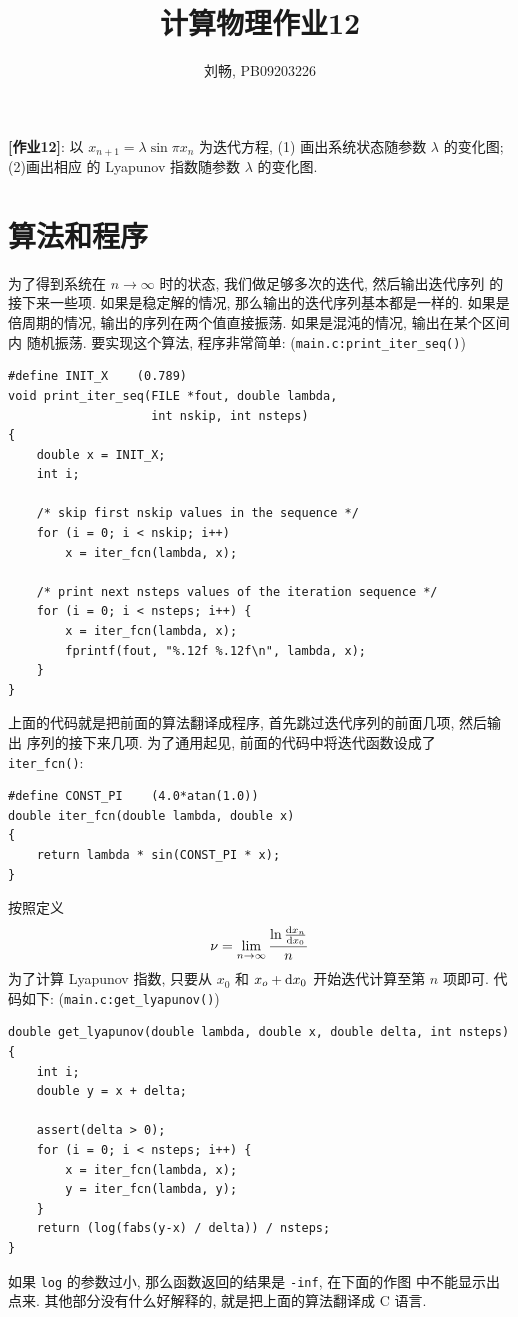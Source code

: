 \documentclass{ctexart}
\def\dd{{\rm d}}
\begin{document}
\title{计算物理作业12}
\author{刘畅, PB09203226}
\maketitle

{\bf [作业12]}: 以 $x_{n+1} = \lambda\sin\pi x_n$ 为迭代方程,
(1) 画出系统状态随参数 $\lambda$ 的变化图; (2)画出相应
的 Lyapunov 指数随参数 $\lambda$ 的变化图.

\section{算法和程序}
为了得到系统在 $n\to\infty$ 时的状态, 我们做足够多次的迭代, 然后输出迭代序列
的接下来一些项. 如果是稳定解的情况, 那么输出的迭代序列基本都是一样的. 如果是
倍周期的情况, 输出的序列在两个值直接振荡. 如果是混沌的情况, 输出在某个区间内
随机振荡. 要实现这个算法, 程序非常简单: (\verb|main.c:print_iter_seq()|)
\begin{verbatim}
#define INIT_X    (0.789)
void print_iter_seq(FILE *fout, double lambda,
                    int nskip, int nsteps)
{
    double x = INIT_X;
    int i;

    /* skip first nskip values in the sequence */
    for (i = 0; i < nskip; i++)
        x = iter_fcn(lambda, x);

    /* print next nsteps values of the iteration sequence */
    for (i = 0; i < nsteps; i++) {
        x = iter_fcn(lambda, x);
        fprintf(fout, "%.12f %.12f\n", lambda, x);
    }
}
\end{verbatim}
上面的代码就是把前面的算法翻译成程序, 首先跳过迭代序列的前面几项, 然后输出
序列的接下来几项. 为了通用起见, 前面的代码中将迭代函数设成了 \verb|iter_fcn()|:
\begin{verbatim}
#define CONST_PI    (4.0*atan(1.0))
double iter_fcn(double lambda, double x)
{
    return lambda * sin(CONST_PI * x);
}
\end{verbatim}

按照定义
\[
\nu = \lim_{n\to\infty}\frac{\ln\frac{\dd x_n}{\dd x_0}}{n}
\]
为了计算 Lyapunov 指数, 只要从 $x_0$ 和 $x_o+\dd x_0$ 开始迭代计算至第 $n$
项即可. 代码如下: (\verb|main.c:get_lyapunov()|)
\begin{verbatim}
double get_lyapunov(double lambda, double x, double delta, int nsteps)
{
    int i;
    double y = x + delta;

    assert(delta > 0);
    for (i = 0; i < nsteps; i++) {
        x = iter_fcn(lambda, x);
        y = iter_fcn(lambda, y);
    }
    return (log(fabs(y-x) / delta)) / nsteps;
}
\end{verbatim}
如果 \verb|log| 的参数过小, 那么函数返回的结果是 \verb|-inf|, 在下面的作图
中不能显示出点来. 其他部分没有什么好解释的, 就是把上面的算法翻译成 C 语言.
\end{document}
